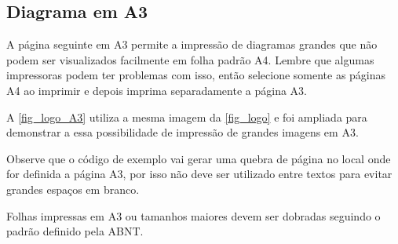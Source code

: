 
\subsection{Diagrama em A3}

A página seguinte em A3 permite a impressão de diagramas grandes que não podem ser visualizados facilmente em folha padrão A4. Lembre que algumas impressoras podem ter problemas com isso, então selecione somente as páginas A4 ao imprimir e depois imprima separadamente a página A3.

A \autoref{fig_logo_A3} utiliza a mesma imagem da \autoref{fig_logo} e foi ampliada para demonstrar a essa possibilidade de impressão de grandes imagens em A3.

Observe que o código de exemplo vai gerar uma quebra de página no local onde for definida a página A3, por isso não deve ser utilizado entre textos para evitar grandes espaços em branco.

Folhas impressas em A3 ou tamanhos maiores devem ser dobradas seguindo o padrão definido pela ABNT. 


